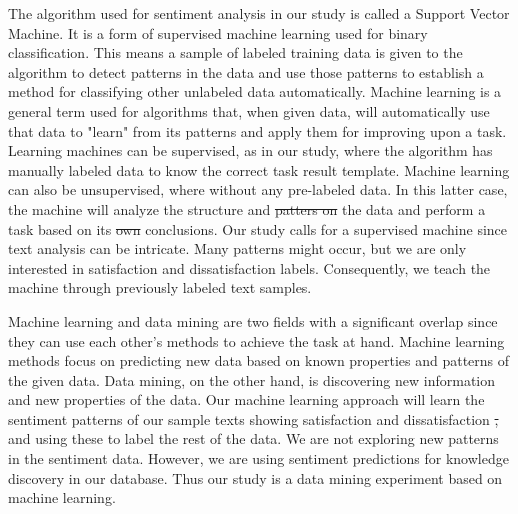 \documentclass[smallextended,natbib]{svjour3}       %
\providecommand{\DIFadd}[1]{{\protect\color{blue}\uwave{#1}}} %
\providecommand{\DIFdel}[1]{{\protect\color{red}\sout{#1}}}                      %
\providecommand{\DIFaddbegin}{} %
\providecommand{\DIFaddend}{} %
\providecommand{\DIFdelbegin}{} %
\providecommand{\DIFdelend}{} %
\newcommand{\DIFscaledelfig}{0.5}
\newlength{\DIFdelgraphicswidth} %
\newlength{\DIFdelgraphicsheight} %
\newcommand{\DIFaddincludegraphics}[2][]{{\color{blue}\fbox{\DIFOincludegraphics[#1]{#2}}}} %
\newcommand{\DIFdelincludegraphics}[2][]{%
\sbox{\DIFdelgraphicsbox}{\DIFOincludegraphics[#1]{#2}}%
\settoboxwidth{\DIFdelgraphicswidth}{\DIFdelgraphicsbox} %
\settoboxtotalheight{\DIFdelgraphicsheight}{\DIFdelgraphicsbox} %
\scalebox{\DIFscaledelfig}{%
\parbox[b]{\DIFdelgraphicswidth}{\usebox{\DIFdelgraphicsbox}\\[-\baselineskip] \rule{\DIFdelgraphicswidth}{0em}}\llap{\resizebox{\DIFdelgraphicswidth}{\DIFdelgraphicsheight}{%
\setlength{\unitlength}{\DIFdelgraphicswidth}%
\begin{picture}(1,1)%
\thicklines\linethickness{2pt} %
{\color[rgb]{1,0,0}\put(0,0){\framebox(1,1){}}}%
{\color[rgb]{1,0,0}\put(0,0){\line( 1,1){1}}}%
{\color[rgb]{1,0,0}\put(0,1){\line(1,-1){1}}}%
\end{picture}%
}\hspace*{3pt}}} %
} %
\DeclareRobustCommand{\DIFaddbegin}{\DIFOaddbegin \let\includegraphics\DIFaddincludegraphics} %
\DeclareRobustCommand{\DIFaddend}{\DIFOaddend \let\includegraphics\DIFOincludegraphics} %
\DeclareRobustCommand{\DIFdelbegin}{\DIFOdelbegin \let\includegraphics\DIFdelincludegraphics} %
\DeclareRobustCommand{\DIFdelend}{\DIFOaddend \let\includegraphics\DIFOincludegraphics} %
\begin{document}
    The algorithm used for sentiment analysis in our study is called a Support Vector Machine. It is a form of supervised machine learning used for binary classification. This means a sample of labeled training data is given to the algorithm to detect patterns in the data and use those patterns to establish a method for classifying other unlabeled data automatically. Machine learning is a general term used for algorithms that, when given data, will automatically use that data to "learn" from its patterns and apply them for improving upon a task. Learning machines can be supervised, as in our study, where the algorithm has manually labeled data to know the correct task result template. Machine learning can also be unsupervised, where without any pre-labeled data. In this latter case, the machine will analyze the structure and \DIFdelbegin \DIFdel{patters on }\DIFdelend \DIFaddbegin \DIFadd{patterns of }\DIFaddend the data and perform a task based on its \DIFdelbegin \DIFdel{own }\DIFdelend conclusions. Our study calls for a supervised machine since text analysis can be intricate. Many patterns might occur, but we are only interested in satisfaction and dissatisfaction labels. Consequently, we teach the machine through previously labeled text samples. 

    Machine learning and data mining are two fields with a significant overlap since they can use each other's methods to achieve the task at hand. Machine learning methods focus on predicting new data based on known properties and patterns of the given data. Data mining, on the other hand, is discovering new information and new properties of the data. Our machine learning approach will learn the sentiment patterns of our sample texts showing satisfaction and dissatisfaction \DIFdelbegin \DIFdel{, }\DIFdelend and using these to label the rest of the data. We are not exploring new patterns in the sentiment data. However, we are using sentiment predictions for knowledge discovery in our database. Thus our study is a data mining experiment based on machine learning.
\end{document}
